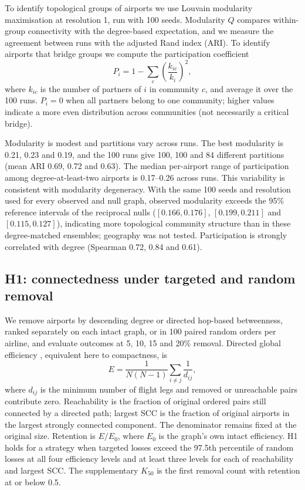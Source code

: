 \documentclass[12pt, a4paper]{article}
\begin{document}
To identify topological groups of airports we use Louvain modularity maximisation
\cite{blondel2008} at resolution 1, run with 100 seeds. Modularity $Q$ compares within-group connectivity with the degree-based expectation, and we measure the
agreement between runs with the adjusted Rand index (ARI). To identify airports that
bridge groups we compute the participation coefficient \cite{guimera2005b}
\begin{equation}
P_i = 1 - \sum_c \left(\frac{k_{ic}}{k_i}\right)^2,
\end{equation}
where $k_{ic}$ is the number of partners of $i$ in community $c$, and average it over
the 100 runs. $P_i=0$ when all partners belong to one community; higher values indicate a more even distribution across communities (not necessarily a critical bridge).

Modularity is modest and partitions vary across runs. The best modularity is 0.21, 0.23
and 0.19, and the 100 runs give 100, 100 and 84 different partitions (mean ARI 0.69,
0.72 and 0.63). The median per-airport range of participation among degree-at-least-two airports is 0.17--0.26 across runs.
This variability is consistent with modularity degeneracy. With the same 100 seeds and resolution used for every observed and null graph, observed modularity exceeds the 95\% reference intervals of the reciprocal nulls ($[0.166, 0.176]$, $[0.199, 0.211]$ and $[0.115, 0.127]$),
indicating more topological community structure than in these degree-matched ensembles; geography was not tested.
Participation is strongly correlated with degree (Spearman 0.72, 0.84 and 0.61).

\subsection{H1: connectedness under targeted and random removal}
\label{sec:h1}

We remove airports by descending degree or directed hop-based betweenness, ranked separately on each intact graph, or in 100 paired random orders per airline, and evaluate outcomes at 5, 10, 15 and 20\% removal. Directed global efficiency \cite{latora2001}, equivalent here to compactness, is
\begin{equation}
E = \frac{1}{N(N-1)} \sum_{i\neq j} \frac{1}{d_{ij}},
\end{equation}
where $d_{ij}$ is the minimum number of flight legs and removed or unreachable pairs contribute zero. Reachability is the fraction of original ordered pairs still connected by a directed path; largest SCC is the fraction of original airports in the largest strongly connected component. The denominator remains fixed at the original size. Retention is $E/E_0$, where $E_0$ is the graph's own intact efficiency. H1 holds for a strategy when targeted losses exceed the 97.5th percentile of random losses at all four efficiency levels and at least three levels for each of reachability and largest SCC. The supplementary $K_{50}$ is the first removal count with retention at or below 0.5.
\end{document}
